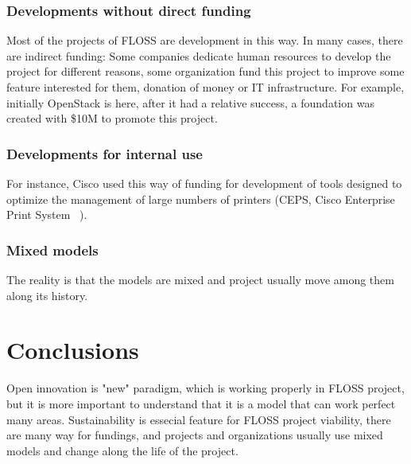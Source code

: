 		\subsubsection{Developments without direct funding} 
		Most of the projects of FLOSS are development in this way. In many cases, there are indirect funding: Some companies dedicate human resources to develop the project for different reasons, some organization fund this project to improve some feature interested for them, donation of money or IT infrastructure.
		For example, initially OpenStack is here, after it had a relative success, a foundation was created with \$10M to promote this project.
		
		\subsubsection{Developments for internal use}
		For instance, Cisco used this way of funding for development of tools designed to optimize the management of large numbers of printers (CEPS, Cisco Enterprise Print System ~\cite{CEPS}).
		
		\subsubsection{Mixed models}
		The reality is that the models are mixed and project usually move among them along its history.

\section{Conclusions}\label{conclusions}
Open innovation is "new" paradigm, which is working properly in FLOSS project, but it is more important to understand that it is a model that can work perfect many areas.
Sustainability is essecial feature for FLOSS project viability, there are many way for fundings, and projects and organizations usually use mixed models and change along the life of the project.
